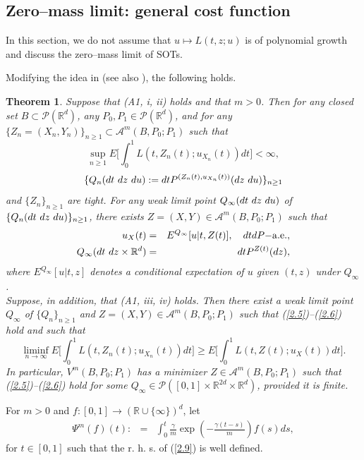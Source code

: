 \documentclass[12pt]{article}
\newtheorem{theorem}{Theorem}[section]
\begin{document}
\subsection{Zero--mass limit: general cost function}

In this section, we do not assume that $u\mapsto L(t,z;u)$ is of polynomial growth and discuss the zero--mass limit of SOTs.

Modifying the idea in \cite{M08,M21} (see also \cite{M2021}), the following holds.

\begin{theorem}\label{pp1.1}
Suppose that (A1, i, ii) holds and that $m>0$.
Then for any closed set $B\subset \mathcal{P}(\mathbb{R}^d)$, 
any  $P_0,P_1\in\mathcal{P}(\mathbb{R}^d)$, and for any $\{Z_n=(X_n, Y_n)\}_{n\ge 1}\subset \mathcal{A}^m(B,P_0;P_1)$ such that 
\begin{equation}\label{2.4}
\sup_{n\ge 1}E\biggl[\int_0^1 L(t,Z_n(t);u_{X_n} (t))dt \biggr]<\infty,
\end{equation}
$$\{Q_n(dt\hbox{ }dz\hbox{ }du):=dtP^{(Z_n(t),u_{X_n} (t))}(dz\hbox{ }du)\}_{n\ge 1}$$ 
and $\{Z_n\}_{n\ge 1}$ are tight.
For any weak limit point $Q_\infty(dt\hbox{ }dz\hbox{ }du)$ of $\{Q_n(dt\hbox{ }dz\hbox{ }du)\}_{n\ge 1}$,
there exists $Z=(X,Y)\in \mathcal{A}^m(B,P_0;P_1)$ such that
\begin{eqnarray}
u_X(t)&=&E^{Q_\infty}[u|t,Z(t)],\quad dtdP{\rm -a.e.},\label{2.5}\\
Q_\infty(dt\hbox{ }dz\times \mathbb{R}^d)&=&dtP^{Z(t)}(dz),\label{2.6}
\end{eqnarray}
where $E^{Q_\infty}[u|t,z]$ denotes a conditional expectation of $u$ given $(t,z)$ under $Q_\infty$.\\
Suppose, in addition,  that (A1, iii, iv) holds. Then
there exist a weak limit point $Q_\infty$ of $\{Q_n\}_{n\ge 1}$ and $Z=(X,Y)\in \mathcal{A}^m(B,P_0;P_1)$ such that (\ref{2.5})--(\ref{2.6}) hold and such that 
\begin{equation}
\liminf_{n\to\infty}E\biggl[\int_0^1 L(t,Z_n(t);u_{X_n} (t))dt \biggr]
\ge E\biggl[\int_0^1 L(t,Z(t);u_{X} (t))dt \biggr].\label{1.9.1}
\end{equation}
In particular, $V^m(B,P_0;P_1)$ has a minimizer  $Z\in \mathcal{A}^m(B,P_0;P_1)$ such that (\ref{2.5})--(\ref{2.6}) hold 
for some $Q_\infty\in \mathcal{P}([0,1]\times \mathbb{R}^{2d}\times \mathbb{R}^{d})$, provided it is finite.
\end{theorem}

For $m>0$ and $f:%
[0,1]\rightarrow (\mathbb{R}\cup\{\infty\})^d$, let %
\begin{eqnarray}\label{2.9}
\Psi^{m} (f)(t):&=&
\int_0^t \frac{\gamma}{m}\exp\left(-\frac{\gamma (t-s)}{m} \right)f(s)ds, %
\end{eqnarray}
for $t\in [0,1]$ such that the r. h. s. of (\ref{2.9}) is well defined.
\end{document}

